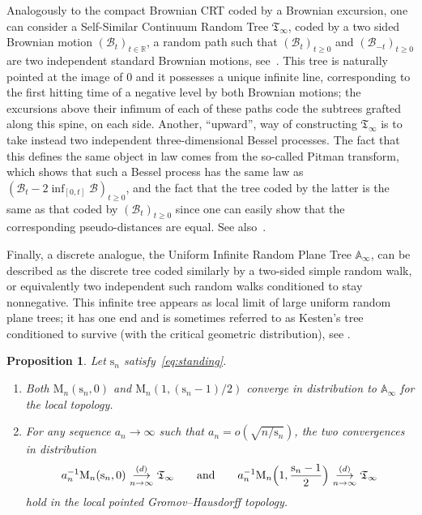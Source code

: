 \documentclass[JEP,XML,SOM,Unicode,NoFloatCountersInSection,NoEqCountersInSection]{cedram}
\theoremstyle{plain}
\newtheorem{proposition}[theorem]{Proposition}
\theoremstyle{definition}
\theoremstyle{remark}
\newcommand{\R}{\mathbb{R}}
\newcommand{\Map}{\mathrm{M}}
\newcommand{\Tree}{\mathfrak{T}}
\newcommand{\spar}{\mathrm{s}}
\newcommand{\cvloi}[1][n]{\,\mathop{\longrightarrow}^{(d)}_{#1 \to \infty}\,}
\begin{document}
Analogously to the compact Brownian CRT coded by a Brownian excursion, one can consider a Self-Similar Continuum Random Tree $\Tree_\infty$, coded by a two sided Brownian motion $(\mathcal{B}_t)_{t \in \R}$, \ie a random path such that $(\mathcal{B}_t)_{t \ge 0}$ and $(\mathcal{B}_{-t})_{t \ge 0}$ are two independent standard Brownian motions, see~\cite[\S 2.5]{Ald91c}. This tree is naturally pointed at the image of $0$ and it possesses a unique infinite line, corresponding to the first hitting time of a negative level by both Brownian motions; the excursions above their infimum of each of these paths code the subtrees grafted along this spine, on each side. Another, ``upward'', way of constructing $\Tree_\infty$ is to take instead two independent three-dimensional Bessel processes. The fact that this defines the same object in law comes from the so-called Pitman transform, which shows that such a Bessel process has the same law as $(\mathcal{B}_t - 2\inf_{[0,t]} \mathcal{B})_{t \ge 0}$, and the fact that the tree coded by the latter is the same as that coded by $(\mathcal{B}_t)_{t \ge 0}$ since one can easily show that the corresponding pseudo-distances are equal. See also~\cite[\S 7.7.6]{Pit06}.

Finally, a discrete analogue, the Uniform Infinite Random Plane Tree $\mathbb{A}_\infty$, can be described as the discrete tree coded similarly by a two-sided simple random walk, or equivalently two independent such random walks conditioned to stay nonnegative. This infinite tree appears as local limit of large uniform random plane trees; it has one end and is sometimes referred to as Kesten's tree conditioned to survive (with the critical geometric distribution), see \eg \cite[\S 5]{Jan12}.

\begin{proposition}\label{prop:limites_arbres}
Let $\spar_n$ satisfy~\eqref{eq:standing}.
\begin{enumerate}
\item Both $\Map_{n}(\spar_{n},0)$ and $\Map_{n}(1, (\spar_{n}-1)/2)$ converge in distribution to $\mathbb{A}_\infty$ for the local topology.

\item For any sequence $a_n \to \infty$ such that $a_n = o(\sqrt{n/\spar_n})$, the two convergences in distribution
\[
a_n^{-1} \Map_{n}(\spar_{n},0) \cvloi \Tree_\infty
\qquad \text{and} \qquad
a_n^{-1} \Map_{n}\Bigl(1,\frac{\spar_{n}-1}{2} \Bigr) \cvloi \Tree_\infty
\]
hold in the local pointed Gromov--Hausdorff topology.
\end{enumerate}
\end{proposition}
\end{document}
